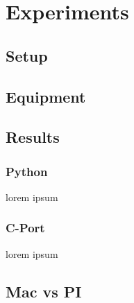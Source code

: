 

\section{Experiments}

\subsection{Setup}

\subsection{Equipment}

\subsection{Results}

\subsubsection{Python}
lorem ipsum

\subsubsection{C-Port}
lorem ipsum

\subsection{Mac vs PI}

